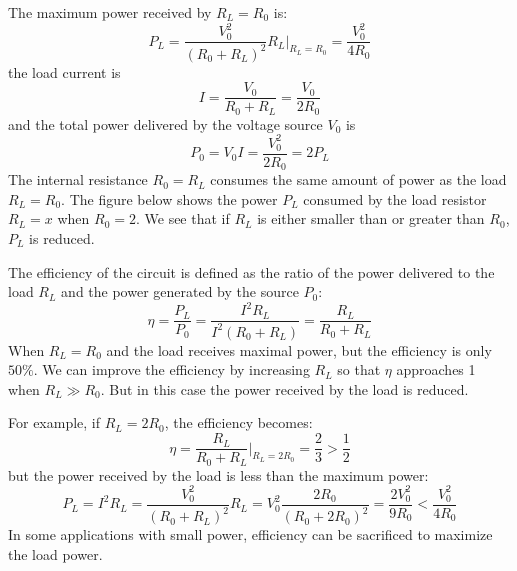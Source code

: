 \documentclass{article}
\begin{document}
\begin{itemize}
  The maximum power received by $R_L=R_0$ is:
  \begin{equation}
    P_L=\frac{V_0^2}{(R_0+R_L)^2} R_L\bigg|_{R_L=R_0}=\frac{V_0^2}{4R_0} 
  \end{equation}
  the load current is 
  \begin{equation}
    I=\frac{V_0}{R_0+R_L}=\frac{V_0}{2R_0}
  \end{equation}
  and the total power delivered by the voltage source $V_0$ is 
  \begin{equation}
    P_0=V_0 I=\frac{V_0^2}{2R_0}=2P_L 
  \end{equation}
  The internal resistance $R_0=R_L$ consumes the same amount of power 
  as the load $R_L=R_0$. The figure below shows the power $P_L$ consumed 
  by the load resistor $R_L=x$ when $R_0=2$. We see that if $R_L$ is 
  either smaller than or greater than $R_0$, $P_L$ is reduced.


  The efficiency of the circuit is defined as the ratio of the power 
  delivered to the load $R_L$ and the power generated by the source $P_0$:
  \begin{equation}
    \eta=\frac{P_L}{P_0}=\frac{I^2 R_L}{I^2 (R_0+R_L)}=\frac{R_L}{R_0+R_L}
  \end{equation}
  When $R_L=R_0$ and the load receives maximal power, but the efficiency 
  is only $50\%$. We can improve the efficiency by increasing $R_L$ so 
  that $\eta$ approaches 1 when $R_L \gg R_0$. But in this case the 
  power received by the load is reduced. 

  For example, if $R_L=2R_0$, the efficiency becomes:
  \begin{equation}
    \eta=\frac{R_L}{R_0+R_L}\bigg|_{R_L=2R_0}=\frac{2}{3}>\frac{1}{2}	
  \end{equation}
  but the power received by the load is less than the maximum power:
  \begin{equation}
    P_L=I^2R_L=\frac{V_0^2}{(R_0+R_L)^2}R_L=V_0^2\frac{2R_0}{(R_0+2R_0)^2}
    =\frac{2V_0^2}{9R_0} < \frac{V_0^2}{4R_0} 
  \end{equation}
  In some applications with small power, efficiency can be sacrificed to 
  maximize the load power. 

  \begin{comment}
  For example, in an audio system, it is important for the speaker's 
  impedance to match the output impedance of the power amplification 
  circuit, so that the speaker can receive maximum power. As the 
  resistance of many speakers is $8\Omega$, all audio amplifiers need
  to be designed to have an $8\Omega$ output resistance in order to 
  deliver maximum power to the speaker. 


\end{comment}
\end{itemize}
\end{document}
